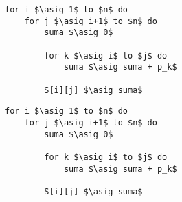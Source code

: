 \documentclass{article}
\newcommand{\asig}{\ensuremath{\leftarrow}}
\begin{document}
\begin{lstlisting}[caption={Cálculo de la tabla C},label=alg:tablaC]
for i $\asig 1$ to $n$ do
    for j $\asig i+1$ to $n$ do
        suma $\asig 0$

        for k $\asig i$ to $j$ do
            suma $\asig suma + p_k$

        S[i][j] $\asig suma$
\end{lstlisting}

\begin{lstlisting}[caption={Cálculo del árbol},label=alg:arbol]
for i $\asig 1$ to $n$ do
    for j $\asig i+1$ to $n$ do
        suma $\asig 0$

        for k $\asig i$ to $j$ do
            suma $\asig suma + p_k$

        S[i][j] $\asig suma$
\end{lstlisting}
\end{document}
